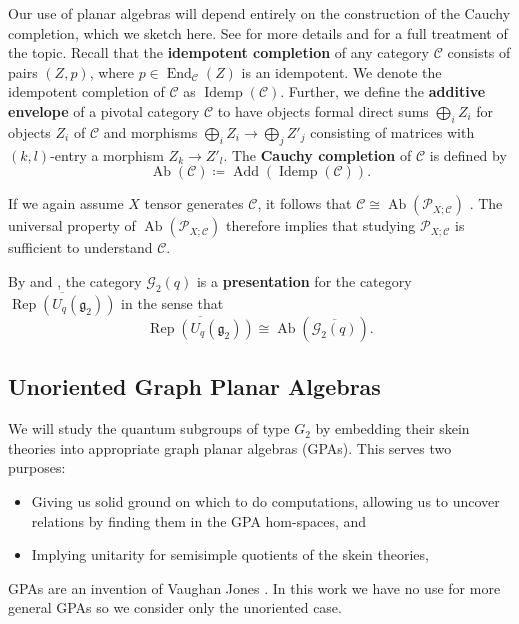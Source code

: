 \documentclass[pdflatex,sn-mathphys-num]{sn-jnl}%
\theoremstyle{thmstyleone}%
\theoremstyle{thmstyletwo}%
\theoremstyle{thmstylethree}%
\newcommand{\CC}{\mathcal{C}}
\newcommand{\GG}{\mathcal{G}}
\newcommand{\PP}{\mathcal{P}}
\newcommand{\ol}{\overline}
\renewcommand{\gg}{\mathfrak{g}}
\newcommand{\cat}[1]{\ol{\Rep(U_{#1}(\gg_2))}}
\DeclareMathOperator{\Rep}{Rep}
\DeclareMathOperator{\End}{End}
\DeclareMathOperator{\Ab}{Ab}
\DeclareMathOperator{\Idemp}{Idemp}
\DeclareMathOperator{\Add}{Add}
\begin{document}
Our use of planar algebras will depend entirely on the construction of the Cauchy completion,
which we sketch here.
See \cite{cain_noah} for more details and \cite{tuba_wenzl} for a full treatment of the topic.
Recall that the {\bf idempotent completion} of any category $\CC$ consists of pairs $(Z,p)$,
where $p\in\End_\CC(Z)$ is an idempotent.
We denote the idempotent completion of $\CC$ as $\Idemp(\CC)$.
Further, we define the {\bf additive envelope} of a pivotal category $\CC$
to have objects formal direct sums $\bigoplus_i Z_i$ for objects $Z_i$ of $\CC$
and morphisms $\bigoplus_i Z_i \to \bigoplus_j Z'_j$ consisting of matrices with
$(k,l)$-entry a morphism $Z_k \to Z'_l$.
The {\bf Cauchy completion} of $\CC$ is defined by 
\[
    \Ab(\CC) \coloneq \Add(\Idemp(\CC)).
\]

If we again assume $X$ tensor generates $\CC$, it follows that $\CC \cong \Ab(\PP_{X;\CC})$ \cite[Theorem 3.4]{tuba_wenzl}.
The universal property of $\Ab(\PP_{X;\CC})$ therefore implies 
that studying $\PP_{X;\CC}$ is sufficient to understand $\CC$. 

By \cite[Corollary 2.20]{bodish_triple_clasp_g2} and \cite[Corollary 6.7]{reconstructing_g2}, 
the category $\GG_2(q)$ is a {\bf presentation} for the category $\cat{q}$ in the sense that
\[
\ol{\Rep(U_q(\gg_2))} \cong \Ab(\ol{\GG_2(q)}).
\]








\subsection{Unoriented Graph Planar Algebras}
We will study the quantum subgroups of type $G_2$ by embedding their skein theories into appropriate graph planar algebras (GPAs). 
This serves two purposes:
\begin{itemize}
    \item Giving us solid ground on which to do computations, allowing us to uncover relations by finding them in the GPA hom-spaces, and
    \item Implying unitarity for semisimple quotients of the skein theories,
\end{itemize}
GPAs are an invention of Vaughan Jones \cite{jones_GPA}.
In this work we have no use for more general GPAs so we consider only the unoriented case. 
\end{document}
